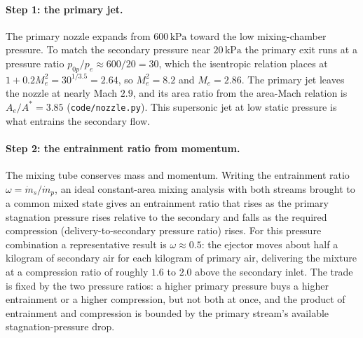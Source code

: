 \paragraph{Step 1: the primary jet.} The primary nozzle expands from
$600\,\text{kPa}$ toward the low mixing-chamber pressure. To match the
secondary pressure near $20\,\text{kPa}$ the primary exit runs at a
pressure ratio $p_{0p}/p_e \approx 600/20 = 30$, which the isentropic
relation places at $1 + 0.2 M_e^2 = 30^{1/3.5} = 2.64$, so
$M_e^2 = 8.2$ and $M_e = 2.86$. The primary jet leaves the nozzle at
nearly Mach $2.9$, and its area ratio from the area-Mach relation is
$A_e/A^* = 3.85$ (\texttt{code/nozzle.py}). This supersonic jet at low
static pressure is what entrains the secondary flow.

\paragraph{Step 2: the entrainment ratio from momentum.} The mixing tube
conserves mass and momentum. Writing the entrainment ratio
$\omega = \dot m_s/\dot m_p$, an ideal constant-area mixing analysis with
both streams brought to a common mixed state gives an entrainment ratio
that rises as the primary stagnation pressure rises relative to the
secondary and falls as the required compression (delivery-to-secondary
pressure ratio) rises. For this pressure combination a representative
result is $\omega \approx 0.5$: the ejector moves about half a kilogram
of secondary air for each kilogram of primary air, delivering the
mixture at a compression ratio of roughly $1.6$ to $2.0$ above the
secondary inlet. The trade is fixed by the two pressure ratios: a higher
primary pressure buys a higher entrainment or a higher compression, but
not both at once, and the product of entrainment and compression is
bounded by the primary stream's available stagnation-pressure drop.

